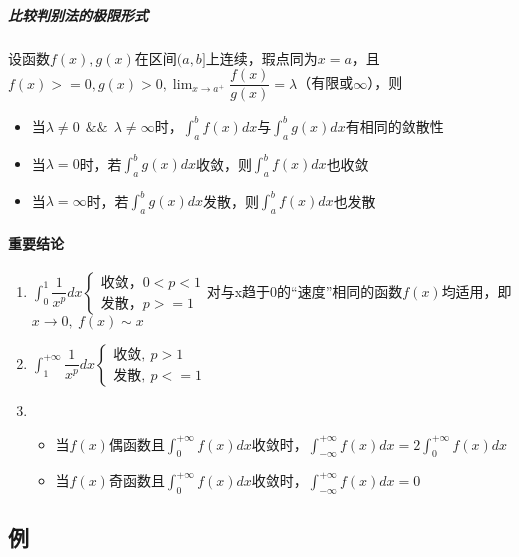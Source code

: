 \subparagraph{比较判别法的极限形式}
设函数\(f(x), g(x)\)在区间\((a, b]\)上连续，瑕点同为\(x = a\)，且\(f(x) >= 0, g(x) > 0, \displaystyle\lim_{x \to a^+}\dfrac{f(x)}{g(x)} = \lambda\)（有限或\(\infty\)），则
\begin{itemize}
    \item 当\(\lambda \neq 0\ \ \&\&\ \ \lambda \neq \infty\)时，\(\displaystyle\int_a^{b}f(x)dx\)与\(\displaystyle\int_a^{b}g(x)dx\)有相同的敛散性
    \item 当\(\lambda = 0\)时，若\(\displaystyle\int_a^{b}g(x)dx\)收敛，则\(\displaystyle\int_a^{b}f(x)dx\)也收敛
    \item 当\(\lambda = \infty\)时，若\(\displaystyle\int_a^{b}g(x)dx\)发散，则\(\displaystyle\int_a^{b}f(x)dx\)也发散
\end{itemize}


\paragraph{重要结论}

\begin{enumerate}
    \item \(\displaystyle\int_0^1\dfrac{1}{x^p}dx
    \begin{cases}
        \text{收敛，}0 < p < 1 \\ 
        \text{发散，}p >= 1
    \end{cases}\)对与x趋于0的“速度”相同的函数\(f(x)\)均适用，即\(x \to 0,\ f(x) \sim x\)
    \item \(\displaystyle\int_1^{+\infty}\dfrac{1}{x^p}dx
    \begin{cases}
        \text{收敛},\ p > 1 \\ 
        \text{发散},\ p <= 1
    \end{cases}\)
    \item \begin{itemize}
        \item 当\(f(x)\)偶函数且\(\int_0^{+\infty}f(x)dx\)收敛时，\(\displaystyle\int_{-\infty}^{+\infty}f(x)dx = 2\int_0^{+\infty}f(x)dx\)
        \item 当\(f(x)\)奇函数且\(\int_0^{+\infty}f(x)dx\)收敛时，\(\displaystyle\int_{-\infty}^{+\infty}f(x)dx = 0\)
    \end{itemize}
\end{enumerate}



\subsection{例}

